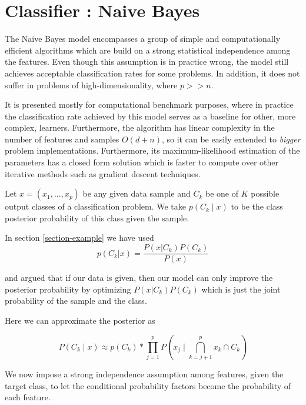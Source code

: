 \section{Classifier : Naive Bayes}

The Naive Bayes model encompasses a group of simple and computationally efficient algorithms which are build on a strong statistical independence among the features. Even though this assumption is in practice wrong, the model still achieves acceptable classification rates for some problems. In addition, it does not suffer in problems of high-dimensionality, where $p >> n$.

It is presented mostly for computational benchmark purposes, where in practice the classification rate achieved by this model serves as a baseline for other, more complex, learners. Furthermore, the algorithm has linear  complexity in the number of features and samples $O(d+n)$, so it can be easily extended to \textit{bigger} problem implementations. Furthermore, its maximum-likelihood estimation of the parameters has a closed form solution which is faster to compute over other iterative methods such as gradient descent techniques.

Let $x = (x_1,...,x_p)$ be any given data sample and $C_k$ be one of $K$ possible output classes of a classification problem. We take $p(C_k \mid x)$  to be the  class posterior probability of this class given the sample.

In section \ref{section-example}
we have used
\begin{equation}
p(C_k| x) = \frac{P(x|C_k)P(C_k)}{P(x)}
\end{equation}
\label{equation-posteriorProbabilties}

and argued that if our data is given, then our model can only improve the posterior probability by optimizing $P(x|C_k)P(C_k)$ which is just the joint probability of the sample and the class.

Here we can approximate the posterior as

\begin{equation}
P(C_k \mid x) \approx p(C_k) * \prod_{j=1}^{p}    P(x_j \mid \bigcap_{k=j+1}^{p} x_k \cap C_k)
\end{equation}
\label{equation-posteriorProbabilityDecomposition1}

We now impose a strong independence assumption among features, given the target class, to let the conditional probability factors become the probability of each feature. %

